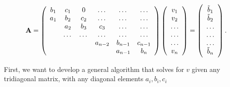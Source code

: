 \documentclass[12pt]{article}
\begin{document}
\begin{equation}
    {\bf A} = \left(\begin{array}{cccccc}
                           b_1& c_1 & 0 &\dots   & \dots &\dots \\
                           a_1 & b_2 & c_2 &\dots &\dots &\dots \\
                           & a_2 & b_3 & c_3 & \dots & \dots \\
                           & \dots   & \dots &\dots   &\dots & \dots \\
                           &   &  &a_{n-2}  &b_{n-1}& c_{n-1} \\
                           &    &  &   &a_{n-1} & b_n \\
                      \end{array} \right)\left(\begin{array}{c}
                           v_1\\
                           v_2\\
                           \dots \\
                          \dots  \\
                          \dots \\
                           v_n\\
                      \end{array} \right)
  =\left(\begin{array}{c}
                           \tilde{b}_1\\
                           \tilde{b}_2\\
                           \dots \\
                           \dots \\
                          \dots \\
                           \tilde{b}_n\\
                      \end{array} \right).
 \end{equation}            
 
   
\noindent First, we want to develop a general algorithm that solves for $v$ given any tridiagonal matrix, with any diagonal elements $a_i, b_i, c_i$ \\
\end{document}
